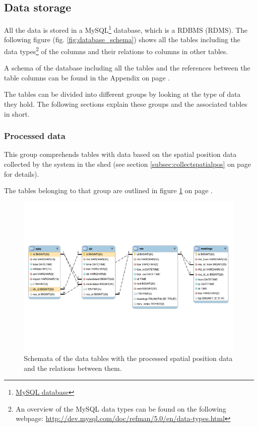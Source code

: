 \subsection{Data storage}
\label{subsec:datastorage}

All the data is stored in a MySQL\footnote{\href{http://www.mysql.com/}{MySQL database}} database, which is  a \acf{RDBMS} (RDMS). The following figure (fig. \ref{fig:database_schema}) shows all the tables including the data types\footnote{An overview of the MySQL data types can be found on the following webpage: \url{http://dev.mysql.com/doc/refman/5.0/en/data-types.html}} of the columns and their relations to columns in other tables. 

A schema of the database including all the tables and the references between the table columns can be found in the Appendix on page \pageref{fig:database_schema_app}.


The tables can be divided into different groups by looking at the type of data they hold. The following sections explain these groups and the associated tables in short.

\subsubsection{Processed data}

This group comprehends tables with data based on the spatial position data collected by the system in the shed (see section \ref{subsec:collectspatialpos} on page \pageref{subsec:collectspatialpos} for details).

The tables belonging to that group are outlined in figure \ref{fig:processed_data_schema} on page \pageref{fig:processed_data_schema}.
 
\begin{figure}[htpb]
\begin{center}
  \includegraphics[width=\textwidth]{assets/pdf/processed_data_schema.pdf}
  \caption[Schema of database tables with processed data]{Schemata of the data tables with the processed spatial position data and the relations between them.}
  \label{fig:processed_data_schema}
\end{center}
\end{figure}

